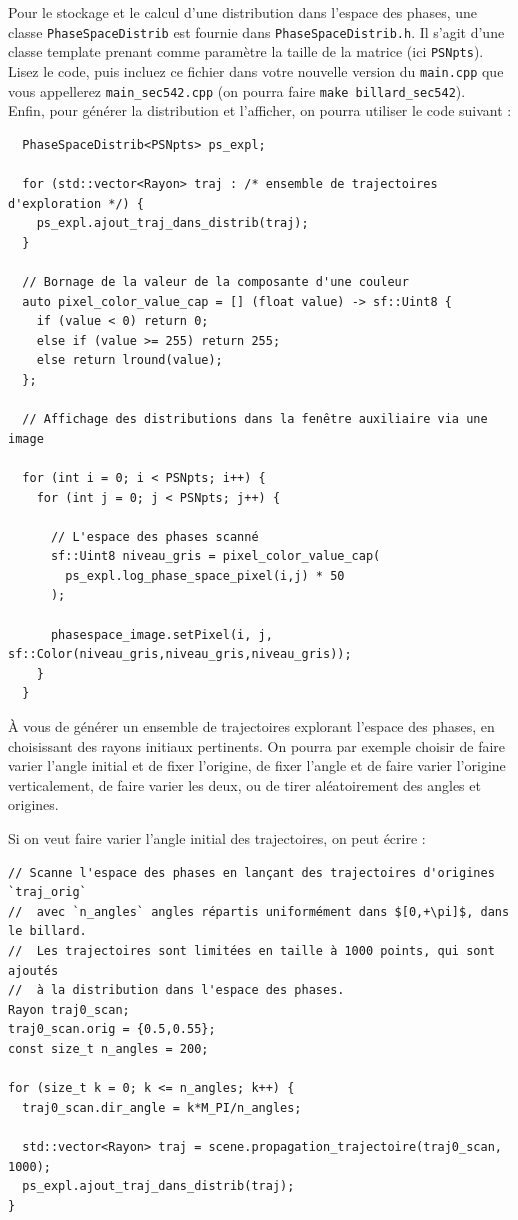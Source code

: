 \documentclass{book}
\newcommand{\inline}[1]{\texttt{#1}}
\def\filename{\texttt}
\begin{document}
Pour le stockage et le calcul d'une distribution dans l'espace des phases, une classe \inline{PhaseSpaceDistrib} est fournie dans \inline{PhaseSpaceDistrib.h}. Il s'agit d'une classe template prenant comme paramètre la taille de la matrice (ici \inline{PSNpts}). Lisez le code, puis incluez ce fichier dans votre nouvelle version du \filename{main.cpp} que vous appellerez \filename{main\_sec542.cpp} (on pourra faire \texttt{make billard\_sec542}).\\

Enfin, pour générer la distribution et l'afficher, on pourra utiliser le code suivant :
\begin{verbatim}
  PhaseSpaceDistrib<PSNpts> ps_expl;

  for (std::vector<Rayon> traj : /* ensemble de trajectoires d'exploration */) {
    ps_expl.ajout_traj_dans_distrib(traj);
  }

  // Bornage de la valeur de la composante d'une couleur
  auto pixel_color_value_cap = [] (float value) -> sf::Uint8 {
    if (value < 0) return 0;
    else if (value >= 255) return 255;
    else return lround(value);
  };
  
  // Affichage des distributions dans la fenêtre auxiliaire via une image

  for (int i = 0; i < PSNpts; i++) {
    for (int j = 0; j < PSNpts; j++) {

      // L'espace des phases scanné
      sf::Uint8 niveau_gris = pixel_color_value_cap(
        ps_expl.log_phase_space_pixel(i,j) * 50
      );

      phasespace_image.setPixel(i, j, sf::Color(niveau_gris,niveau_gris,niveau_gris));
    }
  }
\end{verbatim}
À vous de générer un ensemble de trajectoires explorant l'espace des phases, en choisissant des rayons initiaux pertinents. On pourra par exemple choisir de faire varier l'angle initial et de fixer l'origine, de fixer l'angle et de faire varier l'origine verticalement, de faire varier les deux, ou de tirer aléatoirement des angles et origines.

\begin{correction}
Si on veut faire varier l'angle initial des trajectoires, on peut écrire :
\begin{verbatim}
// Scanne l'espace des phases en lançant des trajectoires d'origines `traj_orig`
//  avec `n_angles` angles répartis uniformément dans $[0,+\pi]$, dans le billard.
//  Les trajectoires sont limitées en taille à 1000 points, qui sont ajoutés
//  à la distribution dans l'espace des phases.
Rayon traj0_scan;
traj0_scan.orig = {0.5,0.55};
const size_t n_angles = 200;

for (size_t k = 0; k <= n_angles; k++) {
  traj0_scan.dir_angle = k*M_PI/n_angles;

  std::vector<Rayon> traj = scene.propagation_trajectoire(traj0_scan, 1000);
  ps_expl.ajout_traj_dans_distrib(traj);
}
\end{verbatim}
\end{correction}
\end{document}
